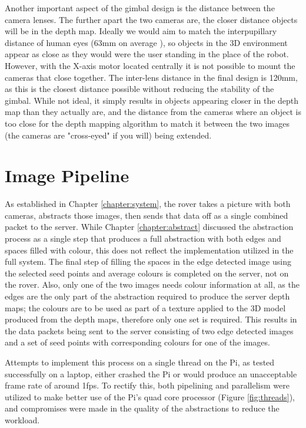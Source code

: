 Another important aspect of the gimbal design is the distance between the camera lenses. The further apart the two cameras are, the closer distance objects will be in the depth map. Ideally we would aim to match the interpupillary distance of human eyes (63mm on average \cite{dodgson2004variation}), so objects in the 3D environment appear as close as they would were the user standing in the place of the robot. However, with the X-axis motor located centrally it is not possible to mount the cameras that close together. The inter-lens distance in the final design is 120mm, as this is the closest distance possible without reducing the stability of the gimbal. While not ideal, it simply results in objects appearing closer in the depth map than they actually are, and the distance from the cameras where an object is too close for the depth mapping algorithm to match it between the two images (the cameras are "cross-eyed" if you will) being extended.

\section{Image Pipeline}
\label{Subsection:comms}

As established in Chapter \ref{chapter:system}, the rover takes a picture with both cameras, abstracts those images, then sends that data off as a single combined packet to the server. While Chapter \ref{chapter:abstract} discussed the abstraction process as a single step that produces a full abstraction with both edges and spaces filled with colour, this does not reflect the implementation utilized in the full system. The final step of filling the spaces in the edge detected image using the selected seed points and average colours is completed on the server, not on the rover. Also, only one of the two images needs colour information at all, as the edges are the only part of the abstraction required to produce the server depth maps; the colours are to be used as part of a texture applied to the 3D model produced from the depth maps, therefore only one set is required. This results in the data packets being sent to the server consisting of two edge detected images and a set of seed points with corresponding colours for one of the images.

Attempts to implement this process on a single thread on the Pi, as tested successfully on a laptop, either crashed the Pi or would produce an unacceptable frame rate of around 1fps. To rectify this, both pipelining and parallelism were utilized to make better use of the Pi's quad core processor (Figure \ref{fig:threads}), and compromises were made in the quality of the abstractions to reduce the workload.

